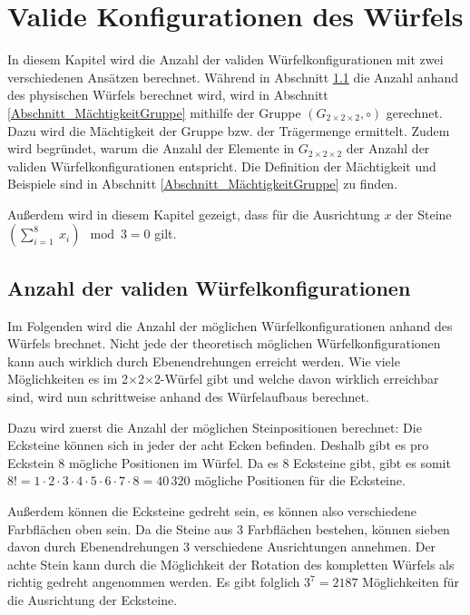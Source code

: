 \documentclass[12pt,a4paper, usenames, dvipsnames]{article}
\theoremstyle{mystyle}
\theoremstyle{definition}
\newcommand{\Gtwo}{\ensuremath{G_{2\times 2\times 2}}}
\newcommand{\Ttwo}{2$\times$2$\times$2-}
\begin{document}
%
%
%
%
%
%
%
%
%
%
%
%
%
%
%
%
%
\newpage

\section{Valide Konfigurationen des Würfels}

\label{Kapitel_ValideKonfigurationen}

In diesem Kapitel wird die Anzahl der validen Würfelkonfigurationen mit zwei verschiedenen Ansätzen berechnet. Während in Abschnitt \ref{Abschnitt_AnzahlKonfigurationen} die Anzahl anhand des physischen Würfels berechnet wird, wird in Abschnitt \ref{Abschnitt_MächtigkeitGruppe} mithilfe der Gruppe $(\Gtwo,\circ)$ gerechnet. Dazu wird die Mächtigkeit der Gruppe bzw. der Trägermenge ermittelt. Zudem wird begründet, warum die Anzahl der Elemente in $\Gtwo$ der Anzahl der validen Würfelkonfigurationen entspricht.
Die Definition der Mächtigkeit und Beispiele sind in Abschnitt \ref{Abschnitt_MächtigkeitGruppe} zu finden. 


Außerdem wird in diesem Kapitel gezeigt, dass für die Ausrichtung $x$ der Steine $( \sum_{i= 1}^{8} \ x_i ) \mod 3 = 0$ gilt.

%
%
%
%
%
%
%
%
%
%
%
%
%
%
%
%
%
%
%
\subsection{Anzahl der validen Würfelkonfigurationen}
\label{Abschnitt_AnzahlKonfigurationen}

Im Folgenden wird die Anzahl der möglichen Würfelkonfigurationen anhand des Würfels brechnet. Nicht jede der theoretisch möglichen Würfelkonfigurationen kann auch wirklich durch Ebenendrehungen erreicht werden. Wie viele Möglichkeiten es im \Ttwo Würfel gibt und welche davon wirklich erreichbar sind, wird nun schrittweise anhand des Würfelaufbaus berechnet. 

Dazu wird zuerst die Anzahl der möglichen Steinpositionen berechnet:
Die Ecksteine können sich in jeder der acht Ecken befinden. Deshalb gibt es pro Eckstein 8 mögliche Positionen im Würfel. Da es 8 Ecksteine gibt, gibt es somit $8! = 1 \cdot 2 \cdot 3 \cdot 4 \cdot 5 \cdot 6 \cdot 7 \cdot 8 = 40\, 320$ mögliche Positionen für die Ecksteine. 

Außerdem können die Ecksteine gedreht sein, es können also verschiedene Farbflächen oben sein. Da die Steine aus 3 Farbflächen bestehen, können sieben davon durch Ebenendrehungen 3 verschiedene Ausrichtungen annehmen. Der achte Stein kann durch die Möglichkeit der Rotation des kompletten Würfels als richtig gedreht angenommen werden. Es gibt folglich $3^7 = 2187$ Möglichkeiten für die Ausrichtung der Ecksteine.
\end{document}
